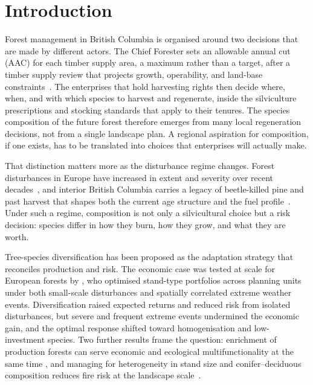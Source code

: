 \section{Introduction}

Forest management in British Columbia is organised around two decisions that are made by
different actors. The Chief Forester sets an allowable annual cut (AAC) for each timber supply area,
a maximum rather than a target, after a timber supply review that projects growth, operability, and
land-base constraints~\citep{government_of_british_columbia_aac_2026}. The enterprises that hold
harvesting rights then decide where, when, and with which species to harvest and regenerate, inside
the silviculture prescriptions and stocking standards that apply to their tenures. The species
composition of the future forest therefore emerges from many local regeneration decisions, not from
a single landscape plan. A regional aspiration for composition, if one exists, has to be translated
into choices that enterprises will actually make.

That distinction matters more as the disturbance regime changes. Forest disturbances in Europe have
increased in extent and severity over recent decades~\citep{seidl_increasing_2014}, and interior
British Columbia carries a legacy of beetle-killed pine and past harvest that shapes both the
current age structure and the fuel profile~\citep{government_of_british_columbia_pg_rationale_2017}.
Under such a regime, composition is not only a silvicultural choice but a risk decision: species
differ in how they burn, how they grow, and what they are worth.

Tree-species diversification has been proposed as the adaptation strategy that reconciles
production and risk. The economic case was tested at scale for European forests by
\citet{fuchs_severe_2024}, who optimised stand-type portfolios across planning units under both
small-scale disturbances and spatially correlated extreme weather events. Diversification raised
expected returns and reduced risk from isolated disturbances, but severe and frequent extreme
events undermined the economic gain, and the optimal response shifted toward homogenisation and
low-investment species. Two further results frame the question: enrichment of production forests
can serve economic and ecological multifunctionality at the same time
\citep{topanotti_enhancing_2024}, and managing for heterogeneity in stand size and conifer--deciduous
composition reduces fire risk at the landscape scale~\citep{zelnik_managing_2025}.

